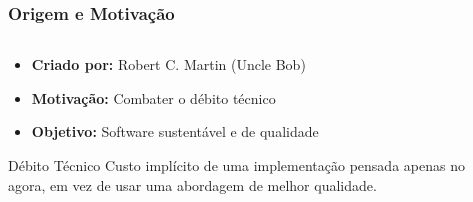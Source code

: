 \documentclass[aspectratio=169]{beamer}
\begin{document}
\begin{frame}
\frametitle{Origem e Motivação}
\begin{columns}
\begin{column}{0.6\textwidth}
\begin{itemize}
    \item \textbf{Criado por:} Robert C. Martin (Uncle Bob)
    \item \textbf{Motivação:} Combater o débito técnico
    \item \textbf{Objetivo:} Software sustentável e de qualidade
\end{itemize}

\vspace{0.5cm}
\begin{block}{Débito Técnico}
Custo implícito de uma implementação pensada apenas no agora, em vez de usar uma abordagem de melhor qualidade.
\end{block}
\end{column}

\begin{column}{0.4\textwidth}
\begin{center}
\end{center}
\end{column}
\end{columns}
\end{frame}
\end{document}
